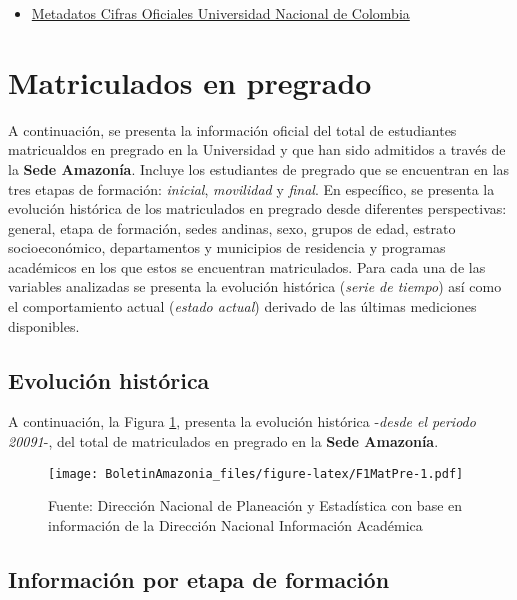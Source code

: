 \documentclass[
]{book}
\providecommand{\tightlist}{%
  \setlength{\itemsep}{0pt}\setlength{\parskip}{0pt}}
\begin{document}
\begin{itemize}
\tightlist
\item
  \href{http://estadisticas.unal.edu.co/menu-principal/cifras-generales/metadatos/cifras-generales/}{Metadatos Cifras Oficiales Universidad Nacional de Colombia}
\end{itemize}

\hypertarget{MatPre}{%
\section{Matriculados en pregrado}\label{MatPre}}

A continuación, se presenta la información oficial del total de estudiantes matricualdos en pregrado en la Universidad y que han sido admitidos a través de la \textbf{Sede Amazonía}. Incluye los estudiantes de pregrado que se encuentran en las tres etapas de formación: \emph{inicial}, \emph{movilidad} y \emph{final}. En específico, se presenta la evolución histórica de los matriculados en pregrado desde diferentes perspectivas: general, etapa de formación, sedes andinas, sexo, grupos de edad, estrato socioeconómico, departamentos y municipios de residencia y programas académicos en los que estos se encuentran matriculados. Para cada una de las variables analizadas se presenta la evolución histórica (\emph{serie de tiempo}) así como el comportamiento actual (\emph{estado actual}) derivado de las últimas mediciones disponibles.

\hypertarget{evoluciuxf3n-histuxf3rica-4}{%
\subsection{Evolución histórica}\label{evoluciuxf3n-histuxf3rica-4}}

A continuación, la Figura \ref{fig:F1MatPre}, presenta la evolución histórica -\emph{desde el periodo 20091}-, del total de matriculados en pregrado en la \textbf{Sede Amazonía}.

\begin{figure}
\centering
\texttt{[image: BoletinAmazonia\_files/figure-latex/F1MatPre-1.pdf]}
\caption{\label{fig:F1MatPre}Fuente: Dirección Nacional de Planeación y Estadística con base en información de la Dirección Nacional Información Académica}
\end{figure}

\hypertarget{informaciuxf3n-por-etapa-de-formaciuxf3n}{%
\subsection{Información por etapa de formación}\label{informaciuxf3n-por-etapa-de-formaciuxf3n}}
\end{document}
